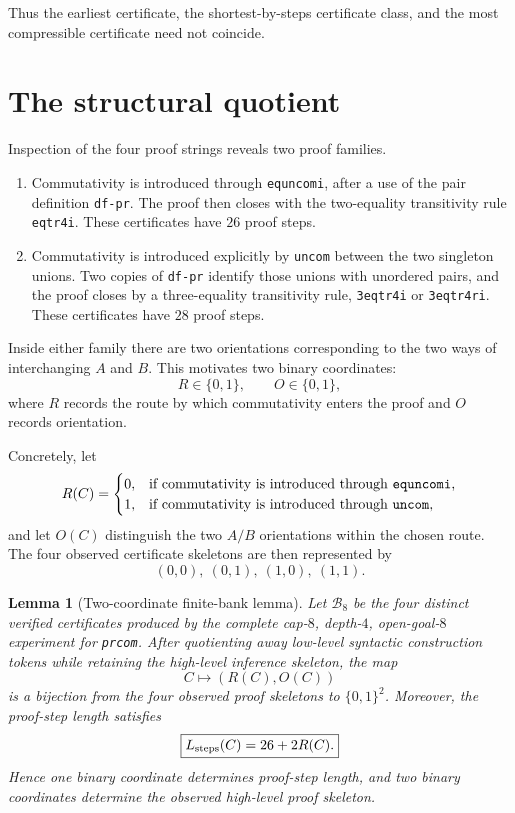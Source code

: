 \documentclass[11pt]{article}
\newtheorem{lemma}{Lemma}
\newcommand{\prcom}{\texttt{prcom}}
\newcommand{\dfpr}{\texttt{df-pr}}
\newcommand{\uncom}{\texttt{uncom}}
\newcommand{\equncomi}{\texttt{equncomi}}
\newcommand{\eqtr}{\texttt{eqtr4i}}
\newcommand{\threeeq}{\texttt{3eqtr4i}}
\newcommand{\threeeqr}{\texttt{3eqtr4ri}}
\begin{document}
Thus the earliest certificate, the shortest-by-steps certificate class, and the
most compressible certificate need not coincide.

\section{The structural quotient}

Inspection of the four proof strings reveals two proof families.

\begin{enumerate}[label=\textbf{Family \arabic*:},leftmargin=5.3em]
\item Commutativity is introduced through \equncomi{}, after a use of the pair
definition \dfpr{}. The proof then closes with the two-equality transitivity rule
\eqtr{}. These certificates have $26$ proof steps.

\item Commutativity is introduced explicitly by \uncom{} between the two singleton
unions. Two copies of \dfpr{} identify those unions with unordered pairs, and the
proof closes by a three-equality transitivity rule, \threeeq{} or \threeeqr{}.
These certificates have $28$ proof steps.
\end{enumerate}

Inside either family there are two orientations corresponding to the two ways of
interchanging $A$ and $B$. This motivates two binary coordinates:
\[
R\in\{0,1\},\qquad O\in\{0,1\},
\]
where $R$ records the route by which commutativity enters the proof and $O$
records orientation.

Concretely, let
\[
R(C)=
\begin{cases}
0,&\text{if commutativity is introduced through \equncomi{},}\\
1,&\text{if commutativity is introduced through \uncom{},}
\end{cases}
\]
and let $O(C)$ distinguish the two $A/B$ orientations within the chosen route.
The four observed certificate skeletons are then represented by
\[
(0,0),\ (0,1),\ (1,0),\ (1,1).
\]

\begin{lemma}[Two-coordinate finite-bank lemma]
Let $\mathcal B_8$ be the four distinct verified certificates produced by the
complete cap-$8$, depth-$4$, open-goal-$8$ experiment for \prcom{}. After
quotienting away low-level syntactic construction tokens while retaining the
high-level inference skeleton, the map
\[
C\longmapsto (R(C),O(C))
\]
is a bijection from the four observed proof skeletons to $\{0,1\}^2$. Moreover,
the proof-step length satisfies
\[
\boxed{L_{\rm steps}(C)=26+2R(C).}
\]
Hence one binary coordinate determines proof-step length, and two binary
coordinates determine the observed high-level proof skeleton.
\end{lemma}
\end{document}
